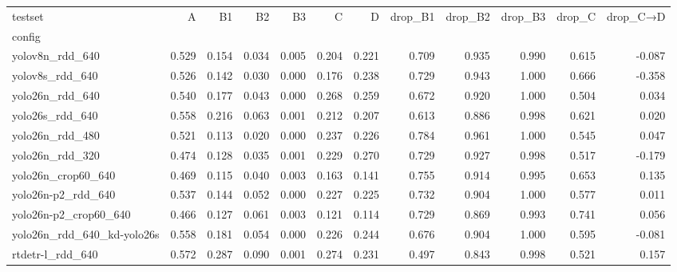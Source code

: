 \begin{tabular}{lrrrrrrrrrrr}
\toprule
testset & A & B1 & B2 & B3 & C & D & drop\_B1 & drop\_B2 & drop\_B3 & drop\_C & drop\_C→D \\
config &  &  &  &  &  &  &  &  &  &  &  \\
\midrule
yolov8n\_rdd\_640 & 0.529 & 0.154 & 0.034 & 0.005 & 0.204 & 0.221 & 0.709 & 0.935 & 0.990 & 0.615 & -0.087 \\
yolov8s\_rdd\_640 & 0.526 & 0.142 & 0.030 & 0.000 & 0.176 & 0.238 & 0.729 & 0.943 & 1.000 & 0.666 & -0.358 \\
yolo26n\_rdd\_640 & 0.540 & 0.177 & 0.043 & 0.000 & 0.268 & 0.259 & 0.672 & 0.920 & 1.000 & 0.504 & 0.034 \\
yolo26s\_rdd\_640 & 0.558 & 0.216 & 0.063 & 0.001 & 0.212 & 0.207 & 0.613 & 0.886 & 0.998 & 0.621 & 0.020 \\
yolo26n\_rdd\_480 & 0.521 & 0.113 & 0.020 & 0.000 & 0.237 & 0.226 & 0.784 & 0.961 & 1.000 & 0.545 & 0.047 \\
yolo26n\_rdd\_320 & 0.474 & 0.128 & 0.035 & 0.001 & 0.229 & 0.270 & 0.729 & 0.927 & 0.998 & 0.517 & -0.179 \\
yolo26n\_crop60\_640 & 0.469 & 0.115 & 0.040 & 0.003 & 0.163 & 0.141 & 0.755 & 0.914 & 0.995 & 0.653 & 0.135 \\
yolo26n-p2\_rdd\_640 & 0.537 & 0.144 & 0.052 & 0.000 & 0.227 & 0.225 & 0.732 & 0.904 & 1.000 & 0.577 & 0.011 \\
yolo26n-p2\_crop60\_640 & 0.466 & 0.127 & 0.061 & 0.003 & 0.121 & 0.114 & 0.729 & 0.869 & 0.993 & 0.741 & 0.056 \\
yolo26n\_rdd\_640\_kd-yolo26s & 0.558 & 0.181 & 0.054 & 0.000 & 0.226 & 0.244 & 0.676 & 0.904 & 1.000 & 0.595 & -0.081 \\
rtdetr-l\_rdd\_640 & 0.572 & 0.287 & 0.090 & 0.001 & 0.274 & 0.231 & 0.497 & 0.843 & 0.998 & 0.521 & 0.157 \\
\bottomrule
\end{tabular}
